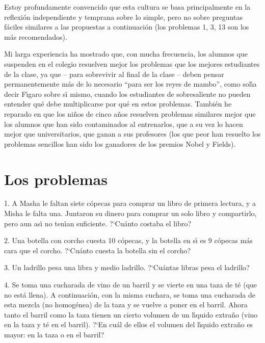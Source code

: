 Estoy profundamente convencido que esta cultura se basa principalmente en la reflexi\'on independiente y
temprana sobre lo simple, pero no sobre preguntas f\'aciles similares a las propuestas a continuaci\'on
(los problemas 1, 3, 13 son los m\'as recomendados).

Mi larga experiencia ha mostrado que, con mucha frecuencia, los alumnos que suspenden en el colegio
resuelven mejor los problemas que los mejores estudiantes de la clase, ya que -- para sobrevivir al final
 de la clase -- deben pensar permanentemente m\'as de lo necesario \enquote{para ser los reyes de mambo},
 como sol\'{\i}a decir F\'{\i}garo sobre s\'{\i} mismo,
cuando los estudiantes de sobresaliente no pueden entender qu\'e debe multiplicarse por qu\'e en estos problemas.
Tambi\'en he reparado en que los ni\~nos de cinco a\~nos resuelven problemas similares mejor
que los alumnos que han sido contaminados al entrenarlos, que a su vez lo hacen mejor que universitarios,
que ganan a sus profesores (los que peor han resuelto los problemas sencillos han sido los ganadores de los premios
Nobel y Fields).

\clearpage
\section*{Los problemas}

\begin{problem}{1.}
	A Masha le faltan siete c\'opecas para comprar un libro de primera lectura, y a Misha le falta una.
	Juntaron su dinero para comprar un solo libro y compartirlo, pero aun as\'{\i} no ten\'{\i}an suficiente.
	?`Cu\'anto costaba el libro?
\end{problem}

\begin{problem}{2.}
	Una botella con corcho cuesta 10 c\'opecas, y la botella en s\'{\i} es 9 c\'opecas m\'as cara
	que el corcho. ?`Cu\'anto cuesta la botella sin el corcho?
\end{problem}

\begin{problem}{3.}
	Un ladrillo pesa una libra y medio ladrillo. ?`Cu\'antas libras pesa el ladrillo?
\end{problem}

\begin{problem}{4.}
	Se toma una cucharada de vino de un barril y se vierte en una taza de t\'e (que no est\'a llena).
	A continuaci\'on, con la misma cuchara, se toma una cucharada de esta mezcla (no homog\'enea) de la taza y se vuelve a
	poner en el barril.
	Ahora tanto el barril como la taza tienen un cierto volumen de un l\'{\i}quido extra\~no (vino en la taza y t\'e en el
	barril). ?`En cu\'al de ellos el volumen del l\'{\i}quido extra\~no es mayor: en la taza o en el barril?
\end{problem}

